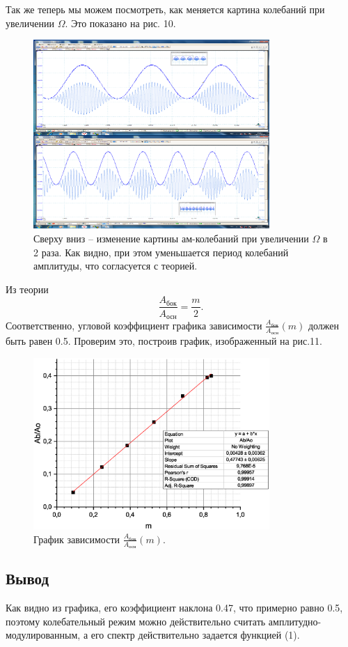 \documentclass[a4paper, 14pt]{extarticle}%
\newcommand\ECaption[1]{%
     \captionsetup{font=footnotesize}%
     \caption{#1}}
\begin{document}
Так же теперь мы можем посмотреть, как меняется картина колебаний при увеличении $\Omega$. Это показано на рис. 10. 

\begin{figure}[h!]
\begin{center}
\includegraphics[width=0.8\textwidth]{m0}
\end{center}
\ECaption{Сверху вниз -- изменение картины ам-колебаний при увеличении $\Omega$ в 2 раза. Как видно, при этом уменьшается период колебаний амплитуды, что согласуется с теорией.}
\end{figure}

Из теории 
\[\frac{A_{\text{бок}}}{A_{\text{осн}}} = \frac{m}{2}.\]
Соответственно, угловой коэффициент графика зависимости $\frac{A_{\text{бок}}}{A_{\text{осн}}}(m)$ должен быть равен 0.5. Проверим это, построив график, изображенный на рис.11.

\begin{figure}[h!]
\begin{center}
\includegraphics[width=0.8\textwidth]{grm}
\end{center}
\ECaption{График зависимости $\frac{A_{\text{бок}}}{A_{\text{осн}}}(m)$.}
\end{figure}

\subsection*{Вывод}

Как видно из графика, его коэффициент наклона 0.47, что примерно равно 0.5, поэтому колебательный режим можно действительно считать амплитудно-модулированным, а его спектр действительно задается функцией (1). 
\end{document}
